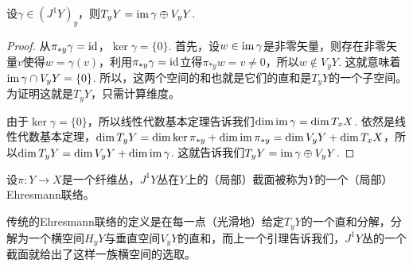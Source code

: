 \begin{lem}
	设$\gamma\in (J^1Y)_y$，则$T_yY=\operatorname{im}\gamma\oplus V_yY$.
\end{lem}

\begin{proof}
	从$\pi_{*y}\gamma=\operatorname{id}$，$\ker \gamma=\{0\}$. 首先，设$w\in \operatorname{im}\gamma$是非零矢量，则存在非零矢量$v$使得$w=\gamma(v)$，利用$\pi_{*y}\gamma=\operatorname{id}$立得$\pi_{*y}w=v\neq 0$，所以$w\not\in  V_yY$. 这就意味着$\operatorname{im}\gamma\cap V_yY=\{0\}$. 所以，这两个空间的和也就是它们的直和是$T_yY$的一个子空间。为证明这就是$T_yY$，只需计算维度。

	由于$\ker \gamma=\{0\}$，所以线性代数基本定理告诉我们$\dim \operatorname{im}\gamma=\dim T_xX$. 依然是线性代数基本定理，$\dim T_yY=\dim \ker \pi_{*y}+\dim \operatorname{im} \pi_{*y}=\dim V_yY+\dim T_xX$，所以$\dim T_yY=\dim V_yY+\dim \operatorname{im}\gamma$. 这就告诉我们$T_yY=\operatorname{im}\gamma\oplus V_yY$.
\end{proof}

\begin{para}[Ehresmann联络]
	设$\pi:Y\to X$是一个纤维丛，$J^1Y$丛在$Y$上的（局部）截面被称为$Y$的一个（局部）Ehresmann联络。
\end{para}

传统的Ehresmann联络的定义是在每一点（光滑地）给定$T_yY$的一个直和分解，分解为一个横空间$H_yY$与垂直空间$V_yY$的直和，而上一个引理告诉我们，$J^1Y$丛的一个截面就给出了这样一族横空间的选取。
